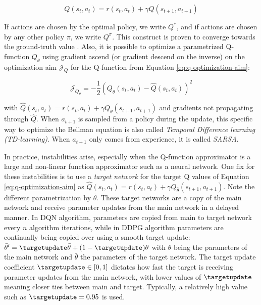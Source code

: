\begin{equation}
Q(s_t, a_t) = r(s_t, a_t) + \gamma Q(s_{t+1}, a_{t+1})
\label{eq:bellman-backup}
\end{equation}

If actions are chosen by the optimal policy, we write $Q^*$, and if actions are chosen by any other policy $\pi$, we write $Q^{\pi}$. This construct is proven to converge towards the ground-truth value \cite{meloConvergenceQlearningSimple2001}. Also, it is possible to optimize a parametrized Q-function $Q_{\theta}$ using gradient ascend (or gradient descend on the inverse) on the optimization aim $\mathcal{J}_{Q}$ for the Q-function from Equation \ref{eq:q-optimization-aim}:

\begin{equation}
\mathcal{J}_{Q_{\theta}} = -\frac{1}{2} (Q_{\theta}(s_t, a_t) - \hat Q(s_t, a_t))^2
\label{eq:q-optimization-aim}
\end{equation}

with $\hat Q(s_t, a_t) = r(s_t, a_t) + \gamma Q_{\theta}(s_{t+1}, a_{t+1})$ and gradients not propagating through $\hat Q$. When $a_{t+1}$ is sampled from a policy during the update, this specific way to optimize the Bellman equation is also called \textit{Temporal Difference learning (TD-learning)}. When $a_{t+1}$ only comes from experience, it is called \textit{SARSA}. 

In practice, instabilities arise, especially when the Q-function approximator is a large and non-linear function approximator such as a neural network. One fix for these instabilities is to use a \textit{target network} for the target Q values of Equation \ref{eq:q-optimization-aim} as $\hat Q(s_t, a_t) = r(s_t, a_t) + \gamma Q_{\bar{\theta}}(s_{t+1}, a_{t+1})$. Note the different parametrization by $\bar{\theta}$. These target networks are a copy of the main network and receive parameter updates from the main network in a delayed manner. In  \ac{DQN} algorithm, parameters are copied from main to target network every $n$ algorithm iterations, while in  \ac{DDPG} algorithm  parameters are continually being copied over using a smooth target update: $\bar{\theta}' = \targetupdate \bar{\theta} + (1-\targetupdate)\theta$ with $\theta$ being the parameters of the main network and $\bar{\theta}$ the parameters of the target network. The target update coefficient $\targetupdate \in [0,1]$ dictates how fast the target is receiving parameter updates from the main network, with lower values of $\targetupdate$ meaning closer ties between main and target. Typically, a relatively high value such as $\targetupdate = 0.95$ is used.

